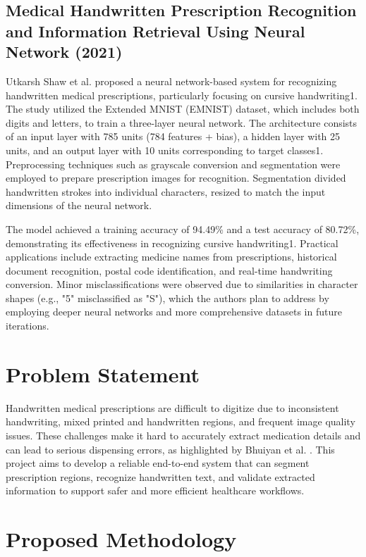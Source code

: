 \documentclass[twocolumn,10pt]{article}
\begin{document}
\subsection{Medical Handwritten Prescription Recognition and Information Retrieval Using Neural Network (2021)}
Utkarsh Shaw et al. \cite{utkarshaw2021} proposed a neural network-based system for recognizing handwritten medical prescriptions, particularly focusing on cursive handwriting1. The study utilized the Extended MNIST (EMNIST) dataset, which includes both digits and letters, to train a three-layer neural network. The architecture consists of an input layer with 785 units (784 features + bias), a hidden layer with 25 units, and an output layer with 10 units corresponding to target classes1. Preprocessing techniques such as grayscale conversion and segmentation were employed to prepare prescription images for recognition. Segmentation divided handwritten strokes into individual characters, resized to match the input dimensions of the neural network.

The model achieved a training accuracy of 94.49\% and a test accuracy of 80.72\%, demonstrating its effectiveness in recognizing cursive handwriting1. Practical applications include extracting medicine names from prescriptions, historical document recognition, postal code identification, and real-time handwriting conversion. Minor misclassifications were observed due to similarities in character shapes (e.g., "5" misclassified as "S"), which the authors plan to address by employing deeper neural networks and more comprehensive datasets in future iterations.

\section{Problem Statement}
Handwritten medical prescriptions are difficult to digitize due to inconsistent handwriting, mixed printed and handwritten regions, and frequent image quality issues. These challenges make it hard to accurately extract medication details and can lead to serious dispensing errors, as highlighted by Bhuiyan et al. \cite{bhuiyan2022online}. This project aims to develop a reliable end-to-end system that can segment prescription regions, recognize handwritten text, and validate extracted information to support safer and more efficient healthcare workflows.



\section{Proposed Methodology}
\end{document}
